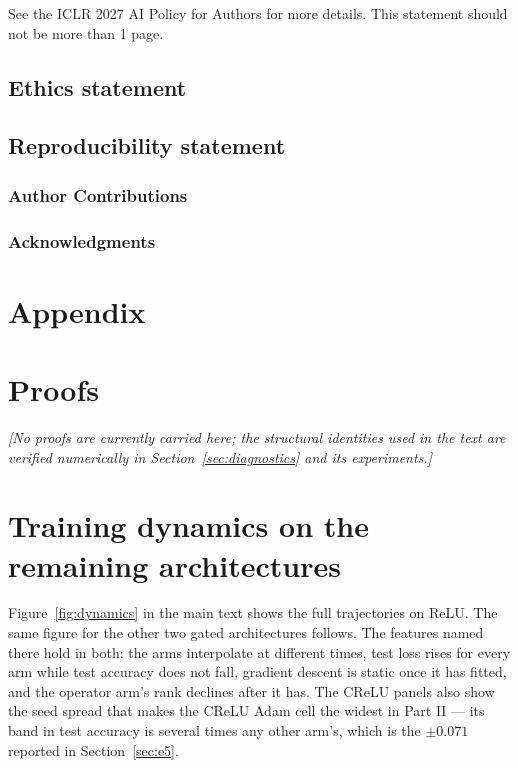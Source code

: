 \documentclass{article} %
\theoremstyle{plain}
\theoremstyle{definition}
\theoremstyle{remark}
\begin{document}
See the ICLR 2027 AI Policy for Authors for more details. This statement should
not be more than 1 page.

\subsection*{Ethics statement}

\subsection*{Reproducibility statement}

\subsubsection*{Author Contributions}

\subsubsection*{Acknowledgments}




\appendix
\section{Appendix}

\section{Proofs}
\label{app:proofs}

\emph{[No proofs are currently carried here; the structural identities used in the text are
verified numerically in Section~\ref{sec:diagnostics} and its experiments.]}

\section{Training dynamics on the remaining architectures}
\label{app:dynamics}

Figure~\ref{fig:dynamics} in the main text shows the full trajectories on ReLU. The same figure
for the other two gated architectures follows. The features named there hold in both: the arms
interpolate at different times, test loss rises for every arm while test accuracy does not fall,
gradient descent is static once it has fitted, and the operator arm's rank declines after it has.
The CReLU panels also show the seed spread that makes the CReLU Adam cell the widest in Part II
--- its band in test accuracy is several times any other arm's, which is the $\pm 0.071$ reported
in Section~\ref{sec:e5}.
\end{document}
